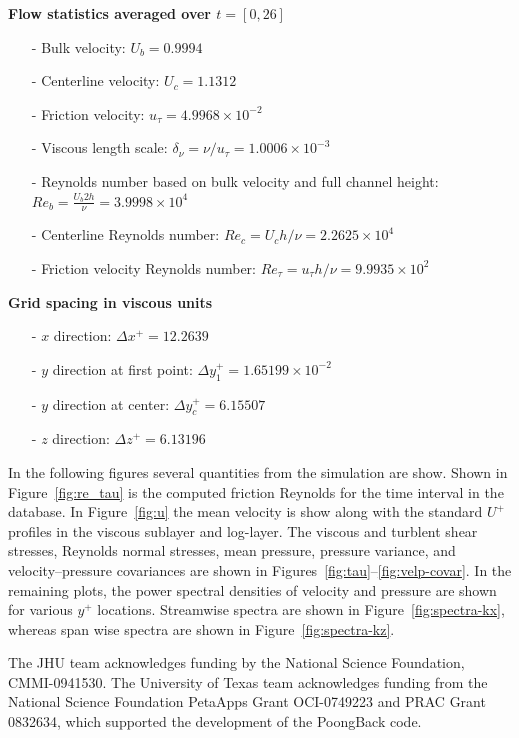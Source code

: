 \documentclass[11pt,letterpaper]{article}
\begin{document}
\vspace{1em}
\noindent \textbf{Flow statistics averaged over $t=[0,26]$}
\begin{itemize}
\itemsep0em
\item[-] Bulk velocity: $U_b = 0.9994$
\item[-] Centerline velocity: $U_c = 1.1312$
\item[-] Friction velocity: $u_\tau = 4.9968 \times 10^{-2}$
\item[-] Viscous length scale: $\delta_\nu = \nu/u_\tau = 1.0006 \times 10^{-3}$
\item[-] Reynolds number based on bulk velocity and full channel height: $Re_b=\frac{U_b 2h}{\nu} = 3.9998 \times 10^{4}$
\item[-] Centerline Reynolds number: $Re_c = U_c h / \nu= 2.2625 \times 10^{4}$
\item[-] Friction velocity Reynolds number: $Re_\tau = u_\tau h / \nu = 9.9935 \times 10^{2}$
\end{itemize}

\vspace{1em}
\noindent \textbf{Grid spacing in viscous units}
\begin{itemize}
\itemsep0em
\item[-] $x$ direction: $\Delta x^+ = 12.2639$
\item[-] $y$ direction at first point: $\Delta y_1^+ = 1.65199 \times 10^{-2}$
\item[-] $y$ direction at center: $\Delta y_c^+ = 6.15507$
\item[-] $z$ direction: $\Delta z^+ = 6.13196$
\end{itemize}

In the following figures several quantities from the simulation are show. Shown in Figure~\ref{fig:re_tau} is the computed friction Reynolds for the time interval in the database. In Figure~\ref{fig:u} the mean velocity is show along with the standard $U^+$ profiles in the viscous sublayer and log-layer. The viscous and turblent shear stresses, Reynolds normal stresses, mean pressure, pressure variance, and velocity--pressure covariances are shown in Figures~\ref{fig:tau}--\ref{fig:velp-covar}. In the remaining plots, the power spectral densities of velocity and pressure are shown for various $y^+$ locations. Streamwise spectra are shown in Figure~\ref{fig:spectra-kx}, whereas span wise spectra are shown in Figure~\ref{fig:spectra-kz}.

\vspace{0.4 cm}
 The JHU team acknowledges funding by the National Science Foundation, CMMI-0941530. The University of Texas team acknowledges funding from the National Science Foundation PetaApps Grant OCI-0749223 and PRAC Grant 0832634, which supported the development of the PoongBack code.
\end{document}
